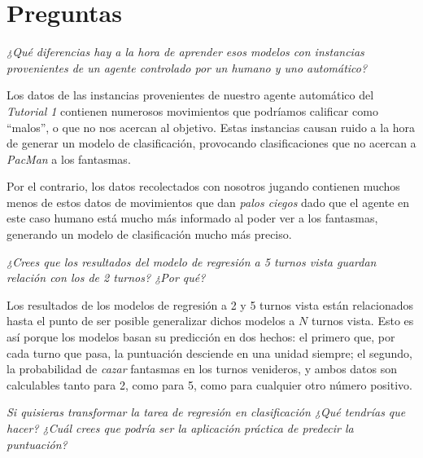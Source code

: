 \documentclass[12pt]{article}
\begin{document}
\newpage
\section{Preguntas}

\begin{center}
    \vspace{0.5cm} \emph{¿Qué diferencias hay a la hora de aprender esos modelos con instancias provenientes de un agente controlado por un humano y uno automático?}
    \vspace{0.3cm}
\end{center}

Los datos de las instancias provenientes de nuestro agente automático del \emph{Tutorial 1} contienen numerosos movimientos que podríamos calificar como ``malos'', o que no nos acercan al objetivo. Estas instancias causan ruido a la hora de generar un modelo de clasificación, provocando clasificaciones que no acercan a \emph{PacMan} a los fantasmas.

Por el contrario, los datos recolectados con nosotros jugando contienen muchos menos de estos datos de movimientos que dan \emph{palos ciegos} dado que el agente en este caso humano está mucho más informado al poder ver a los fantasmas, generando un modelo de clasificación mucho más preciso.

\begin{center}
    \vspace{0.3cm} \emph{¿Crees que los resultados del modelo de regresión a 5 turnos vista guardan relación con los de 2 turnos? ¿Por qué?}
    \vspace{0.3cm}
\end{center}

Los resultados de los modelos de regresión a 2 y 5 turnos vista están relacionados hasta el punto de ser posible generalizar dichos modelos a $N$ turnos vista. Esto es así porque los modelos basan su predicción en dos hechos: el primero que, por cada turno que pasa, la puntuación desciende en una unidad siempre; el segundo, la probabilidad de \emph{cazar} fantasmas en los turnos venideros, y ambos datos son calculables tanto para 2, como para 5, como para cualquier otro número positivo.

\begin{center}
    \vspace{0.3cm} \emph{Si quisieras transformar la tarea de regresión en clasificación ¿Qué tendrías que hacer? ¿Cuál crees que podría ser la aplicación práctica de predecir la puntuación?}
    \vspace{0.3cm}
\end{center}
\end{document}
